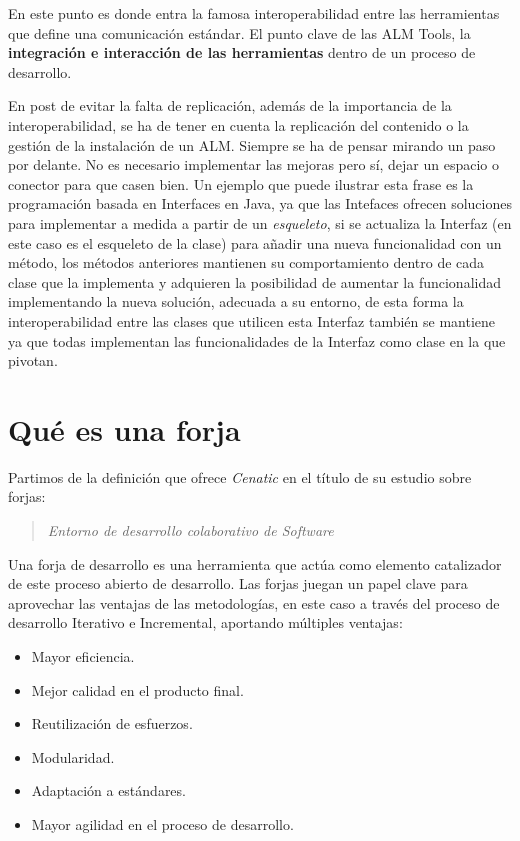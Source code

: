 \par En este punto es donde entra la famosa interoperabilidad entre las herramientas que define una comunicación estándar. El punto clave de las ALM Tools, la \textbf{integración e interacción de las herramientas} dentro de un proceso de desarrollo.

\par En post de evitar la falta de replicación, además de la importancia de la interoperabilidad, se ha de tener en cuenta la replicación del contenido o la gestión de la instalación de un ALM. Siempre se ha de pensar mirando un paso por delante. No es necesario implementar las mejoras pero sí, dejar un espacio o conector para que casen bien. Un ejemplo que puede ilustrar esta frase es la programación basada en Interfaces en Java, ya que las Intefaces ofrecen soluciones para implementar a medida a partir de un \emph{esqueleto}, si se actualiza la Interfaz (en este caso es el esqueleto de la clase) para añadir una nueva funcionalidad con un método, los métodos anteriores mantienen su comportamiento dentro de cada clase que la implementa y adquieren la posibilidad de aumentar la funcionalidad implementando la nueva solución, adecuada a su entorno, de esta forma la interoperabilidad entre las clases que utilicen esta Interfaz también se mantiene ya que todas implementan las funcionalidades de la Interfaz como clase en la que pivotan.


\section{Qué es una forja}
\label{sec:que-es}

\par Partimos de la definición que ofrece \emph{Cenatic} en el título de su estudio sobre forjas:

\begin{quote}
    \emph{Entorno de desarrollo colaborativo de Software}
\end{quote}

\par Una forja de desarrollo es una herramienta que actúa como elemento catalizador de este proceso abierto de desarrollo. Las forjas juegan un papel clave para aprovechar las ventajas de las metodologías, en este caso a través del proceso de desarrollo Iterativo e Incremental, aportando múltiples ventajas:

\begin{itemize}
	\item Mayor eficiencia.
	\item Mejor calidad en el producto final.
	\item Reutilización de esfuerzos.
	\item Modularidad.
	\item Adaptación a estándares.
	\item Mayor agilidad en el proceso de desarrollo.
\end{itemize}

